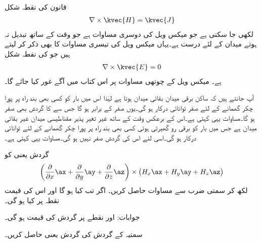  قانون کی نقطہ شکل
\begin{align}\label{مساوات-مقناطیسی_مقناطیسی_گردش_صفر}
\nabla \times \kvec{H}=\kvec{J}
\end{align}
لکھی جا سکتی ہے جو  میکس ویل کی دوسری مساوات ہے جو وقت کے ساتھ تبدیل نہ ہوتے میدان کے لئے درست ہے۔یہاں میکس ویل کی تیسری مساوات کا بھی ذکر کر لیتے ہیں جو  کی نقطہ شکل
\begin{align}\label{مساوات-مقناطیسی_برقی_گردش_صفر}
\nabla \times \kvec{E}=0
\end{align}
ہے۔ میکس ویل کے چوتھی مساوات پر اس کتاب میں آگے غور کیا جائے گا۔

آپ جانتے ہیں کہ ساکن برقی میدان  بقائی میدان ہوتا ہے لہٰذا اس میں بار  کو کسی بھی بند راہ پر پورا چکر گھمانے کے لئے صفر توانائی درکار ہو گی۔یوں  صفر کے برابر ہو گا جس سے  کا گردش بھی صفر ہو گا۔مساوات  یہی کہتی ہے۔اس کے برعکس وقت کے ساتھ غیر تغیر پذیر مقناطیسی میدان غیر بقائی میدان ہے جس میں بار کو برقی رو گھیرتی ہوئی کسی بھی بند راہ پر پورا چکر گھمانے کے لئے توانائی درکار ہو گی۔اسی لئے اس کی گردش صفر نہیں ہو گی۔مساوات  یہی کہتی ہے۔


گردش یعنی  کو
\begin{align*}
\left(\frac{\partial }{\partial x}\ax+\frac{\partial }{\partial y}\ay+\frac{\partial }{\partial z}\az \right) \times \left(H_x \ax+H_y \ay+H_z \az \right)
\end{align*}
لکھ کر سمتی ضرب سے مساوات  حاصل کریں۔
اگر  تب  کیا ہو گا اور اس کی قیمت نقطہ  پر کیا ہو گی۔

جوابات: اور نقطے پر گردش کی قیمت  ہو گی۔

سمتیہ  کے گردش کی گردش یعنی  حاصل کریں۔

